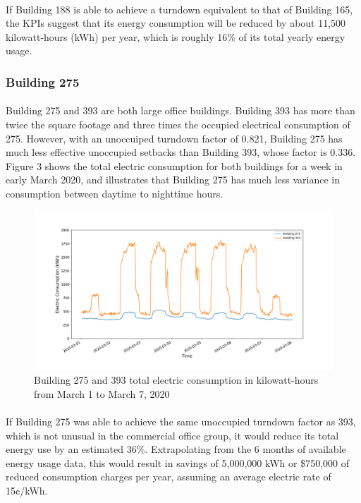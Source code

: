 \documentclass[a4paper]{article}
\begin{document}
\paragraph{}
If Building 188 is able to achieve a turndown equivalent to that of Building 165, the KPIs suggest that its energy consumption will be reduced by about 11,500 kilowatt-hours (kWh) per year, which is roughly 16\% of its total yearly energy usage.

\subsubsection{Building 275}

\paragraph{}
Building 275 and 393 are both large office buildings. Building 393 has more than twice the square footage and three times the occupied electrical consumption of 275. However, with an unoccuiped turndown factor of 0.821, Building 275 has much less effective unoccupied setbacks than Building 393, whose factor is 0.336. Figure 3 shows the total electric consumption for both buildings for a week in early March 2020, and illustrates that Building 275 has much less variance in consumption between daytime to nighttime hours.

\begin{figure}[H]
\centering
\includegraphics[width=.9\columnwidth]{./images/275v393_Turndown.png}
\caption{Building 275 and 393 total electric consumption in kilowatt-hours from March 1 to March 7, 2020}
\end{figure}

\paragraph{}
If Building 275 was able to achieve the same unoccupied turndown factor as 393, which is not unusual in the commercial office group, it would reduce its total energy use by an estimated 36\%. Extrapolating from the 6 months of available energy usage data, this would result in savings of 5,000,000 kWh or \$750,000 of reduced consumption charges per year, assuming an average electric rate of 15¢/kWh.
\end{document}
